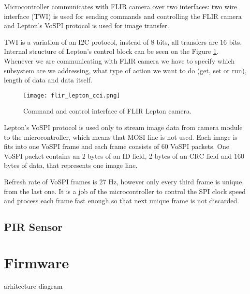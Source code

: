 Microcontroller communicates with FLIR camera over two interfaces: two wire interface (TWI) is used for sending commands and controlling the FLIR camera and Lepton's VoSPI protocol is used for image transfer.

TWI is a variation of an I2C protocol, instead of 8 bits, all transfers are 16 bits.
Internal structure of Lepton's control block can be seen on the Figure \ref{flir_lepton_cci}.
Whenever we are communicating with FLIR camera we have to specify which subsystem are we addressing, what type of action we want to do (get, set or run), length of data and data itself.

\begin{figure}[ht]
        \centering
        \texttt{[image: flir\_lepton\_cci.png]} 
        \caption{ Command and control interface of FLIR Lepton camera.} 
        \label{flir_lepton_cci}
\end{figure}

Lepton's VoSPI protocol is used only to stream image data from camera module to the microcontroller, which means that MOSI line is not used.
Each image is fits into one VoSPI frame and each frame consists of 60 VoSPI packets.
One VoSPI packet contains an 2 bytes of an ID field, 2 bytes of an CRC field and 160 bytes of data\footnotemark, that represents one image line.

Refresh rate of VoSPI frames is 27 \si{\hertz}, however only every third frame is unique from the last one.
It is a job of the microcontroller to control the SPI clock speed and process each frame fast enough so that next unique frame is not discarded.



\subsection{ PIR Sensor}

\section{ Firmware}
    arhitecture diagram 

